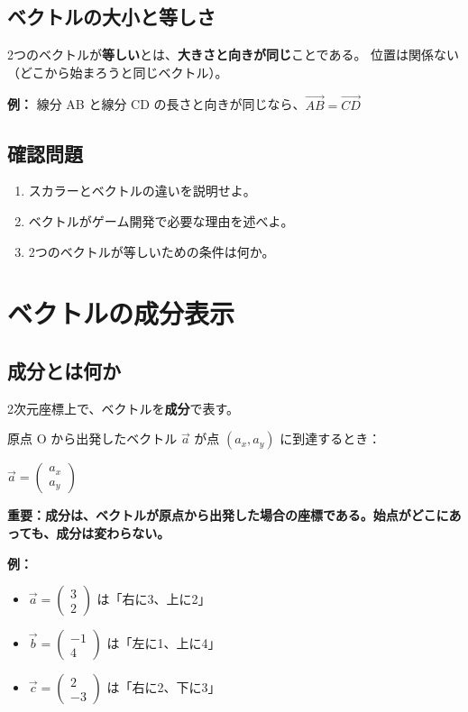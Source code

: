 \documentclass[paper=a4,fleqn]{jlreq}
\newcommand{\formula}[1]{%
  \vspace{4pt}%
  \begin{center}{\large\bfseries\boldmath\(\displaystyle #1\)}\end{center}%
  \vspace{4pt}%
}
\begin{document}
\subsection{ベクトルの大小と等しさ}

2つのベクトルが\textbf{等しい}とは、\textbf{大きさと向きが同じ}ことである。
位置は関係ない（どこから始まろうと同じベクトル）。

\textbf{例：} 線分 AB と線分 CD の長さと向きが同じなら、\(\overrightarrow{AB} = \overrightarrow{CD}\)

\subsection{確認問題}
\begin{enumerate}
  \item スカラーとベクトルの違いを説明せよ。
  \item ベクトルがゲーム開発で必要な理由を述べよ。
  \item 2つのベクトルが等しいための条件は何か。
\end{enumerate}

\newpage
\section{ベクトルの成分表示}

\subsection{成分とは何か}

2次元座標上で、ベクトルを\textbf{成分}で表す。

原点 O から出発したベクトル \(\vec{a}\) が点 \((a_x, a_y)\) に到達するとき：

\formula{\vec{a} = \begin{pmatrix} a_x \\ a_y \end{pmatrix}}

\textbf{重要：成分は、ベクトルが原点から出発した場合の座標である。始点がどこにあっても、成分は変わらない。}

\textbf{例：}
\begin{itemize}
  \item \(\vec{a} = \begin{pmatrix} 3 \\ 2 \end{pmatrix}\) は「右に3、上に2」
  \item \(\vec{b} = \begin{pmatrix} -1 \\ 4 \end{pmatrix}\) は「左に1、上に4」
  \item \(\vec{c} = \begin{pmatrix} 2 \\ -3 \end{pmatrix}\) は「右に2、下に3」
\end{itemize}
\end{document}

